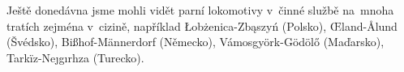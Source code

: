 \documentclass[a4paper]{article}
\begin{document}
\sloppy

Ještě donedávna jsme mohli vidět parní lokomotivy v~činné službě na~mnoha tratích zejména v~cizině, například \L ob\.{z}enica-Zb\k{a}szy\'{n} (Polsko), \OE land-\AA lund (Švédsko), Bi\ss hof-M\"{a}nnerdorf (Německo), Vámosgy\"{o}rk-G\"{o}d\"{o}l\H{o} (Maďarsko), Tark\"{i}z-Ne\j g\i rhza (Turecko).
\end{document}
